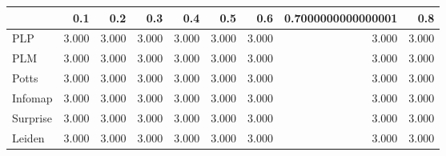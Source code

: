 \begin{tabular}{lrrrrrrrr}
\toprule
{} &   0.1 &   0.2 &   0.3 &   0.4 &   0.5 &   0.6 & 0.7000000000000001 &   0.8 \\
\midrule
PLP      & 3.000 & 3.000 & 3.000 & 3.000 & 3.000 & 3.000 &              3.000 & 3.000 \\
PLM      & 3.000 & 3.000 & 3.000 & 3.000 & 3.000 & 3.000 &              3.000 & 3.000 \\
Potts    & 3.000 & 3.000 & 3.000 & 3.000 & 3.000 & 3.000 &              3.000 & 3.000 \\
Infomap  & 3.000 & 3.000 & 3.000 & 3.000 & 3.000 & 3.000 &              3.000 & 3.000 \\
Surprise & 3.000 & 3.000 & 3.000 & 3.000 & 3.000 & 3.000 &              3.000 & 3.000 \\
Leiden   & 3.000 & 3.000 & 3.000 & 3.000 & 3.000 & 3.000 &              3.000 & 3.000 \\
\bottomrule
\end{tabular}
